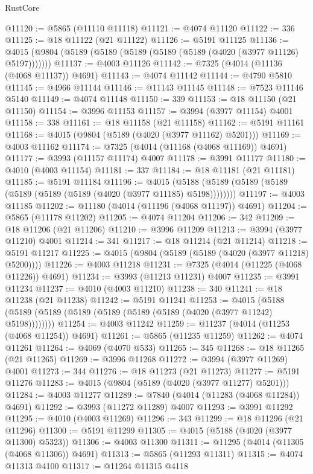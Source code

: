 \begin{lexlean}{RustCore}
\begin{coremodule}
@11120 := @5865 (@11110 @11118)
@11121 := @4074 @11120
@11122 := 336
@11125 := @18 @11122 (@21 @11122)
@11126 := @5191 @11125
@11136 := @4015 (@9804 (@5189 (@5189 (@5189 (@5189 (@5189 (@4020 (@3977 @11126) @5197)))))))
@11137 := @4003 @11126
@11142 := @7325 (@4014 (@11136 (@4068 @11137)) @4691)
@11143 := @4074 @11142
@11144 := @4790 @5810
@11145 := @4966 @11144
@11146 := @11143 @11145
@11148 := @7523 @11146 @5140
@11149 := @4074 @11148
@11150 := 339
@11153 := @18 @11150 (@21 @11150)
@11154 := @3996 @11153
@11157 := @3994 (@3977 @11154) @4001
@11158 := 338
@11161 := @18 @11158 (@21 @11158)
@11162 := @5191 @11161
@11168 := @4015 (@9804 (@5189 (@4020 (@3977 @11162) @5201)))
@11169 := @4003 @11162
@11174 := @7325 (@4014 (@11168 (@4068 @11169)) @4691)
@11177 := @3993 (@11157 @11174) @4007
@11178 := @3991 @11177
@11180 := @4010 (@4003 @11154)
@11181 := 337
@11184 := @18 @11181 (@21 @11181)
@11185 := @5191 @11184
@11196 := @4015 (@5188 (@5189 (@5189 (@5189 (@5189 (@5189 (@5189 (@4020 (@3977 @11185) @5198))))))))
@11197 := @4003 @11185
@11202 := @11180 (@4014 (@11196 (@4068 @11197)) @4691)
@11204 := @5865 (@11178 @11202)
@11205 := @4074 @11204
@11206 := 342
@11209 := @18 @11206 (@21 @11206)
@11210 := @3996 @11209
@11213 := @3994 (@3977 @11210) @4001
@11214 := 341
@11217 := @18 @11214 (@21 @11214)
@11218 := @5191 @11217
@11225 := @4015 (@9804 (@5189 (@5189 (@4020 (@3977 @11218) @5200))))
@11226 := @4003 @11218
@11231 := @7325 (@4014 (@11225 (@4068 @11226)) @4691)
@11234 := @3993 (@11213 @11231) @4007
@11235 := @3991 @11234
@11237 := @4010 (@4003 @11210)
@11238 := 340
@11241 := @18 @11238 (@21 @11238)
@11242 := @5191 @11241
@11253 := @4015 (@5188 (@5189 (@5189 (@5189 (@5189 (@5189 (@5189 (@4020 (@3977 @11242) @5198))))))))
@11254 := @4003 @11242
@11259 := @11237 (@4014 (@11253 (@4068 @11254)) @4691)
@11261 := @5865 (@11235 @11259)
@11262 := @4074 @11261
@11264 := @4069 (@4070 @533)
@11265 := 345
@11268 := @18 @11265 (@21 @11265)
@11269 := @3996 @11268
@11272 := @3994 (@3977 @11269) @4001
@11273 := 344
@11276 := @18 @11273 (@21 @11273)
@11277 := @5191 @11276
@11283 := @4015 (@9804 (@5189 (@4020 (@3977 @11277) @5201)))
@11284 := @4003 @11277
@11289 := @7840 (@4014 (@11283 (@4068 @11284)) @4691)
@11292 := @3993 (@11272 @11289) @4007
@11293 := @3991 @11292
@11295 := @4010 (@4003 @11269)
@11296 := 343
@11299 := @18 @11296 (@21 @11296)
@11300 := @5191 @11299
@11305 := @4015 (@5188 (@4020 (@3977 @11300) @5323))
@11306 := @4003 @11300
@11311 := @11295 (@4014 (@11305 (@4068 @11306)) @4691)
@11313 := @5865 (@11293 @11311)
@11315 := @4074 @11313 @4100
@11317 := @11264 @11315 @4118

\end{coremodule}
\end{lexlean}
